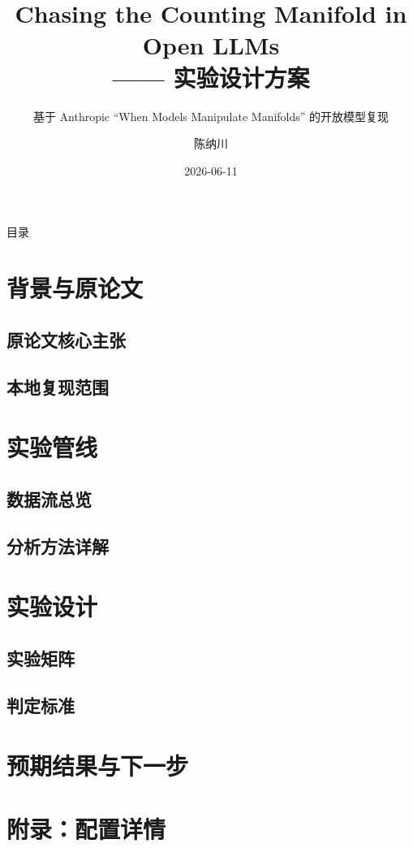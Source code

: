 \documentclass[fontset=fandol,aspectratio=169,11pt]{ctexbeamer}
\title[Counting Manifolds 复现]{Chasing the Counting Manifold in Open LLMs\\—— 实验设计方案}
\subtitle{基于 Anthropic ``When Models Manipulate Manifolds'' 的开放模型复现}
\author{陈纳川}
\date{2026-06-11}
\begin{document}
\begin{frame}
  \titlepage
\end{frame}

\begin{frame}{目录}
  \tableofcontents[hideallsubsections]
\end{frame}

\section{背景与原论文}
\subsection{原论文核心主张}

\subsection{本地复现范围}


\section{实验管线}
\subsection{数据流总览}

\subsection{分析方法详解}


\section{实验设计}
\subsection{实验矩阵}

\subsection{判定标准}


\section{预期结果与下一步}


\appendix
\section{附录：配置详情}

\end{document}
